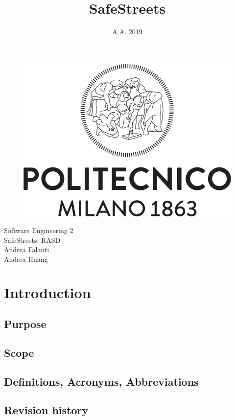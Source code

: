 \documentclass[12pt]{article}
\title{SafeStreets}
\date{A.A. 2019}
\begin{document}
\clearpage
\begin{figure}
    \centering
    \includegraphics[width=\linewidth]{Logo_Politecnico_Milano.png}
    \label{fig:my_label}
\end{figure}


{
    \centering
    \Huge Software Engineering 2\\
    \Huge SafeStreets: RASD\\
    \vspace*{\fill}
    \large Andrea Falanti\\
    \large Andrea Huang
    \par
}
    
\thispagestyle{empty}

\newpage
\tableofcontents

\newpage
\section{Introduction}
    \subsection{Purpose}
        
    \subsection{Scope}
    \subsection{Definitions, Acronyms, Abbreviations}
    \subsection{Revision history}
\end{document}

